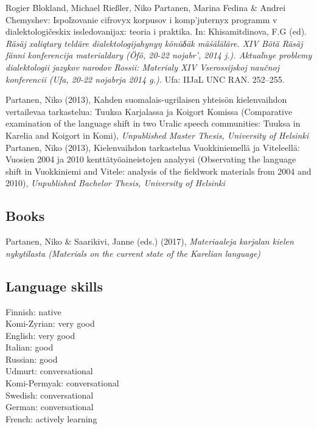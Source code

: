 \documentclass[11pt, a4paper]{article}
\newcommand{\years}[1]{\marginnote{\scriptsize #1}} %
\begin{document}
\years{2014} Rogier Blokland, Michael Rießler, Niko Partanen, Marina Fedina \& Andrei Chemyshev: Ispoľzovanie cifrovyx korpusov i komp’juternyx programm v dialektologičeskix issledovanijax: teoria i praktika. In: Khisamitdinova, F.G (ed). \emph{Räsäj xaliqtary teldäre dialektologijahynyŋ könüδäk mäśäläläre. XIV Bötä Räsäj fänni konferencija materialdary (Öfö, 20-22 nojabr’, 2014 j.). Aktuaľnye problemy dialektologii jazykov narodov Rossii: Materialy XIV Vserossijskoj naučnoj konferencii (Ufa, 20-22 nojabrja 2014 g.).} Ufa: IIJaL UNC RAN. 252–255.

\years{2013}Partanen, Niko (2013), Kahden suomalais-ugrilaisen yhteisön kielenvaihdon vertailevaa tarkastelua: Tuuksa Karjalassa ja Koigort Komissa (Comparative examination of the language shift in two Uralic speech communities: Tuuksa in Karelia and Koigort in Komi), \emph{Unpublished Master Thesis, University of Helsinki}\\

\years{2013}Partanen, Niko (2013), Kielenvaihdon tarkastelua Vuokkiniemellä ja Viteleellä: Vuosien 2004 ja 2010 kenttätyöaineistojen analyysi (Observating the language shift in Vuokkiniemi and Vitele: analysis of the fieldwork materials from 2004 and 2010), \emph{Unpublished Bachelor Thesis, University of Helsinki}\\



\subsection*{Books}

\years{forthcoming}Partanen, Niko \& Saarikivi, Janne (eds.) (2017), \emph{Materiaaleja karjalan kielen nykytilasta (Materials on the current state of the Karelian language)}


\subsection*{Language skills}

Finnish: native\\
Komi-Zyrian: very good\\
English: very good\\
Italian: good\\
Russian: good\\
Udmurt: conversational\\
Komi-Permyak: conversational\\
Swedish: conversational\\
German: conversational\\
French: actively learning\\
\end{document}
